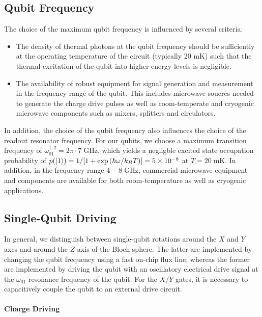 \subsection{Qubit Frequency}

The choice of the maximum qubit frequency is influenced by several criteria:

\begin{itemize}
\item The density of thermal photons at the qubit frequency should be sufficiently at the operating temperature of the circuit (typically 20 mK) such that the thermal excitation of the qubit into higher energy levels is negligible.
\item The availability of robust equipment for signal generation and measurement in the frequency range of the qubit. This includes microwave soucres needed to generate the charge drive pulses as well as room-temperate and cryogenic microwave components such as mixers, splitters and circulators.
\end{itemize}

In addition, the choice of the qubit frequency also influences the choice of the readout resonator frequency. For our qubits, we choose a maximum transition frequency of $\omega_{01}^{1,2}= 2\pi \cdot 7 \;\mathrm{GHz}$, which yields a negligble excited state occupation probability of $p(\left| 1 \right>)=1/[1+\exp{(\hbar \omega / k_B T)}]=5\times 10^{-8}$ at $T=20\;\mathrm{mK}$. In addition, in the frequency range $4-8\;\mathrm{GHz}$, commercial microwave equipment and components are available for both room-temperature as well as cryogenic applications.

\subsection{Single-Qubit Driving}

In general, we distinguish between single-qubit rotations around the $X$ and $Y$ axes and around the $Z$ axis of the Bloch sphere. The latter are implemented by changing the qubit frequency using a fast on-chip flux line, whereas the former are implemented by driving the qubit with an oscillatory electrical drive signal at the $\omega_{01}$ resonance frequency of the qubit. For the $X/Y$ gates, it is necessary to capacitively couple the qubit to an external drive circuit. 

\paragraph{Charge Driving}


